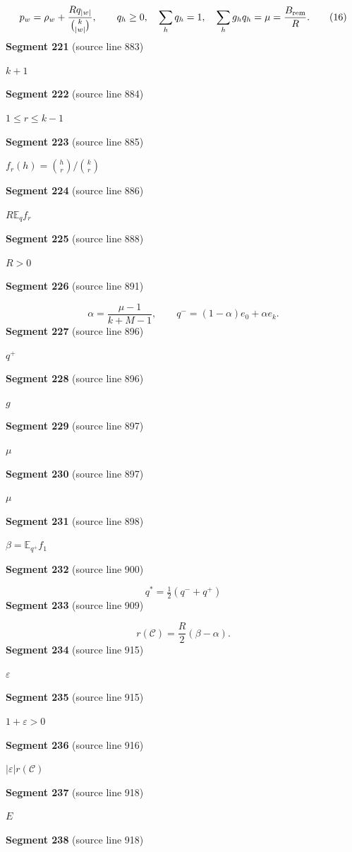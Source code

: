 \documentclass[11pt]{article}
\begin{document}
\[
p_w=\rho_w+\frac{R q_{|w|}}{\binom{k}{|w|}},
\qquad
q_h\ge0,\quad \sum_hq_h=1,\quad
\sum_h g_hq_h=\mu=\frac{B_{\rm rem}}R.
\tag{16}
\]
\textbf{Segment 221} (source line 883)\par
\( k+1 \)\par
\textbf{Segment 222} (source line 884)\par
\( 1\le r\le k-1 \)\par
\textbf{Segment 223} (source line 885)\par
\( f_r(h)=\binom hr/\binom kr \)\par
\textbf{Segment 224} (source line 886)\par
\( R\mathbb E_qf_r \)\par
\textbf{Segment 225} (source line 888)\par
\( R>0 \)\par
\textbf{Segment 226} (source line 891)\par
\[
\alpha=\frac{\mu-1}{k+M-1},\qquad
q^-=(1-\alpha)e_0+\alpha e_k.
\]
\textbf{Segment 227} (source line 896)\par
\( q^+ \)\par
\textbf{Segment 228} (source line 896)\par
\( g \)\par
\textbf{Segment 229} (source line 897)\par
\( \mu \)\par
\textbf{Segment 230} (source line 897)\par
\( \mu \)\par
\textbf{Segment 231} (source line 898)\par
\( \beta=\mathbb E_{q^+}f_1 \)\par
\textbf{Segment 232} (source line 900)\par
\[
q^*=\tfrac12(q^-+q^+)
\tag{17}
\]
\textbf{Segment 233} (source line 909)\par
\[
r(\mathcal C)=\frac R2(\beta-\alpha).
\tag{18}
\]
\textbf{Segment 234} (source line 915)\par
\( \varepsilon \)\par
\textbf{Segment 235} (source line 915)\par
\( 1+\varepsilon>0 \)\par
\textbf{Segment 236} (source line 916)\par
\( |\varepsilon|r(\mathcal C) \)\par
\textbf{Segment 237} (source line 918)\par
\( E \)\par
\textbf{Segment 238} (source line 918)\par
\end{document}
